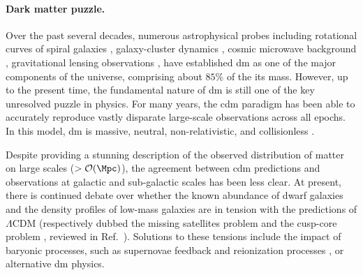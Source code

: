 \paragraph*{Dark matter puzzle.} Over the past several decades, numerous astrophysical probes including rotational curves of spiral galaxies \cite{Rubin:1980zd}, galaxy-cluster dynamics \cite{Zwicky:1933gu}, cosmic microwave background \cite{Planck:2015fie}, gravitational lensing observations \cite{Taylor:1998uk}, have established \gls*{dm} as one of the major components of the universe, comprising about $85\%$ of the its mass. However, up to the present time, the fundamental nature of \gls*{dm} is still one of the key unresolved puzzle in physics. For many years, the \gls*{cdm} paradigm has been able to accurately reproduce vastly disparate large-scale observations across all epochs. In this model, \gls*{dm} is massive, neutral, non-relativistic, and collisionless \cite{Peebles:1982ff}. %

Despite providing a stunning description of the observed distribution of matter on large scales ($>\order{\si{\Mpc}}$), the agreement between \gls*{cdm} predictions and observations at galactic and sub-galactic scales has been less clear. At present, there is continued debate over whether the known abundance of dwarf galaxies and the density profiles of low-mass galaxies are in tension with the predictions of $\Lambda$CDM (respectively dubbed the missing satellites problem \cite{Moore:1999nt,Klypin:1999uc} and the cusp-core problem \cite{deBlok:1997zlw}, reviewed in Ref.~\cite{Bullock:2017xww}).
Solutions to these tensions include the impact of baryonic processes, such as supernovae feedback and reionization processes \cite{Bullock:2010uy}, or alternative \gls*{dm} physics. %

